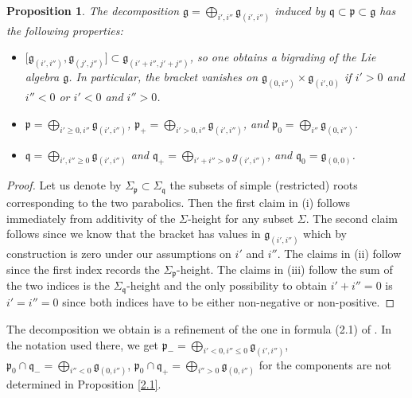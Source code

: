 \documentclass[pdftex]{sigma}
\numberwithin{equation}{section}
\newtheorem{Proposition}[Theorem]{Proposition}
 { \theoremstyle{definition}
\newtheorem{Definition}[Theorem]{Definition}
\newtheorem{Example}[Theorem]{Example}
\newtheorem{Remark}[Theorem]{Remark} }
\def\frak{\mathfrak}
\newcommand{\x}{\times}
\newcommand{\Si}{\Sigma}
\begin{document}
\begin{Proposition}\label{prop2.1}\samepage
The decomposition $\frak g=\bigoplus_{i',i''}\frak g_{(i',i'')}$ induced by $\frak
q\subset\frak p\subset\frak g$ has the following properties:
\begin{itemize}\itemsep=0pt
\item[$(i)$] $\bigl[\frak g_{(i',i'')},\frak g_{(j',j'')}\bigr]\subset \frak g_{(i'+i'',j'+j'')}$, so one
obtains a bigrading of the Lie algebra $\frak g$. In particular, the bracket vanishes
on $\frak g_{(0,i'')}\x \frak g_{(i',0)}$ if $i'>0$ and $i''<0$ or $i'<0$ and $i''>0$.

\item[$(ii)$] $\frak p=\bigoplus_{i'\geq 0,i''}\frak g_{(i',i'')}$, $\frak
p_+=\bigoplus_{i'>0,i''}\frak g_{(i',i'')}$, and $\frak p_0=\bigoplus_{i''}\frak g_{(0,i'')}$.

\item[$(iii)$] $\frak q=\bigoplus_{i',i''\geq 0}\frak g_{(i',i'')}$ and
$\frak q_+=\bigoplus_{i'+i''>0} g_{(i',i'')}$, and $\frak q_0=\frak g_{(0,0)}$.
\end{itemize}
\end{Proposition}
\begin{proof}
 Let us denote by $\Si_{\frak p}\subset\Si_{\frak q}$ the subsets of simple
 (restricted) roots corresponding to the two parabolics. Then the first claim in (i)
 follows immediately from additivity of the $\Si$-height for any subset $\Si$. The
 second claim follows since we know that the bracket has values in
 $\frak g_{(i',i'')}$ which by construction is zero under our assumptions on $i'$ and
 $i''$. The claims in (ii) follow since the first index records the
 $\Si_{\frak p}$-height. The claims in (iii) follow the sum of the two indices
 is the $\Si_{\frak q}$-height and the only possibility to obtain $i'+i''=0$ is
 $i'=i''=0$ since both indices have to be either non-negative or non-positive.
\end{proof}

The decomposition we obtain is a refinement of the one in formula (2.1) of \cite{Rel-BGG1}.
In the notation used there, we get
$\frak p_-=\bigoplus_{i'<0,i''\leq 0}\frak g_{(i',i'')}$,
$\frak p_0\cap\frak q_-=\bigoplus_{i''<0}\frak g_{(0,i'')}$,
$\frak p_0\cap\frak q_+=\bigoplus_{i''>0}\frak g_{(0,i'')}$ for the components are not
determined in Proposition \ref{2.1}.
\end{document}
